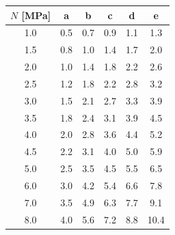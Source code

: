 \begin{tabular}{c ccccc}
\toprule
$N$ [MPa] & a & b & c & d & e\\
\midrule
1.0 & 0.5 & 0.7 & 0.9 & 1.1 & 1.3\\
1.5 & 0.8 & 1.0 & 1.4 & 1.7 & 2.0\\
2.0 & 1.0 & 1.4 & 1.8 & 2.2 & 2.6\\
2.5 & 1.2 & 1.8 & 2.2 & 2.8 & 3.2\\
3.0 & 1.5 & 2.1 & 2.7 & 3.3 & 3.9\\
3.5 & 1.8 & 2.4 & 3.1 & 3.9 & 4.5\\
4.0 & 2.0 & 2.8 & 3.6 & 4.4 & 5.2\\
4.5 & 2.2 & 3.1 & 4.0 & 5.0 & 5.9\\
5.0 & 2.5 & 3.5 & 4.5 & 5.5 & 6.5\\
6.0 & 3.0 & 4.2 & 5.4 & 6.6 & 7.8\\
7.0 & 3.5 & 4.9 & 6.3 & 7.7 & 9.1\\
8.0 & 4.0 & 5.6 & 7.2 & 8.8 & 10.4\\
\bottomrule
\end{tabular}
